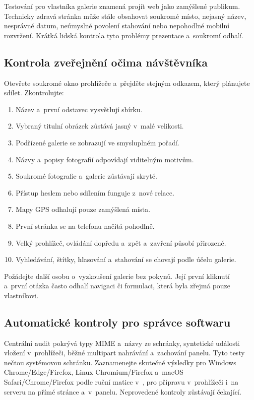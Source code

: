 \documentclass[11pt,a4paper]{article}
\newcommand{\filepath}[1]{\path{#1}}
\begin{document}
Testování pro vlastníka galerie znamená projít web jako zamýšlené publikum.
Technicky zdravá stránka může stále obsahovat soukromé místo, nejasný název,
nesprávné datum, neúmyslné povolení stahování nebo nepohodlné mobilní rozvržení.
Krátká lidská kontrola tyto problémy prezentace a~soukromí odhalí.

\subsection{Kontrola zveřejnění očima návštěvníka}

Otevřete soukromé okno prohlížeče a~přejděte stejným odkazem, který plánujete
sdílet. Zkontrolujte:

\begin{enumerate}
  \item Název a~první odstavec vysvětlují sbírku.
  \item Vybraný titulní obrázek zůstává jasný v~malé velikosti.
  \item Podřízené galerie se zobrazují ve smysluplném pořadí.
  \item Názvy a~popisy fotografií odpovídají viditelným motivům.
  \item Soukromé fotografie a~galerie zůstávají skryté.
  \item Přístup heslem nebo sdílením funguje z~nové relace.
  \item Mapy GPS odhalují pouze zamýšlená místa.
  \item První stránka se na telefonu načítá pohodlně.
  \item Velký prohlížeč, ovládání dopředu a~zpět a~zavření působí přirozeně.
  \item Vyhledávání, štítky, hlasování a~stahování se chovají podle účelu
  galerie.
\end{enumerate}

Požádejte další osobu o~vyzkoušení galerie bez pokynů. Její první kliknutí
a~první otázka často odhalí navigaci či formulaci, která byla zřejmá pouze
vlastníkovi.

\subsection{Automatické kontroly pro správce softwaru}

Centrální audit pokrývá typy MIME a~názvy ze schránky, syntetické události
vložení v~prohlížeči, běžné multipart nahrávání a~zachování panelu. Tyto testy
nečtou systémovou schránku. Zaznamenejte skutečné výsledky pro Windows
Chrome/Edge/Firefox, Linux Chromium/Firefox a~macOS Safari/Chrome/Firefox podle
ruční matice v~\filepath{TESTING.md}, pro přípravu v~prohlížeči i~na serveru na
přímé stránce a~v~panelu. Neprovedené kontroly zůstávají čekající.
\end{document}
